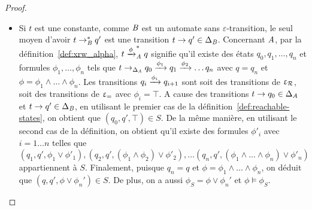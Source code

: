 \begin{proof}
\begin{itemize}
\item Si $t$ est une constante, comme $\mathit B$ est un automate sans $\varepsilon$-transition, le seul
  moyen d'avoir $t \rightarrow^*_\mathit B q'$ est une transition $t \rightarrow q' \in \Delta_\mathit B$. Concernant
  $\mathit A$, par la définition~\ref{def:xrw_alpha}, $t\xrightarrow{\phi}^*_\mathit A q$ signifie
  qu'il existe des états $q_0,q_1, \ldots, q_n$ et formules $\phi_1,\ldots,
  \phi_n$ tels que $t \rightarrow_{\Delta_\mathit A} q_0 \xrightarrow{\phi_1} q_1 \xrightarrow{\phi_2}
  \ldots q_n$ avec $q=q_n$ et $\phi=\phi_1\wedge \ldots \wedge
  \phi_n$. %
  Les transitions $q_i \xrightarrow{\phi_i} q_{i+1}$ sont soit des transitions de $\upvarepsilon_{\mathcal R}$, soit
  des transitions de $\upvarepsilon_{=}$ avec $\phi_i=\top$.  A cause des transitions $t \rightarrow q_0
  \in \Delta_\mathit A$ et $t \rightarrow q' \in \Delta_\mathit B$, en utilisant le premier cas de la
  définition~\ref{def:reachable-states}, on obtient que $(q_0,q',\top) \in
  S$. De la même manière, en utilisant le second cas de la définition, on obtient qu'il existe
  des formules $\phi'_i$ avec $i=1\ldots n$ telles que $(q_1,q', \phi_1\vee
  \phi'_1), (q_2,q',(\phi_1\wedge\phi_2)\vee \phi'_2),\ldots (q_n,q', (\phi_1
  \wedge \ldots \wedge \phi_n)\vee \phi'_n)$ appartiennent à $S$. 
  Finalement, puisque $q_n=q$ et $\phi=\phi_1\wedge \ldots \wedge \phi_n$, on déduit que
  $(q,q',\phi\vee\phi_n') \in S$. De plus, on a aussi $\phi_S=
  \phi\vee \phi_n'$ et $\phi \models \phi_S$. %


\end{itemize}
\end{proof}
